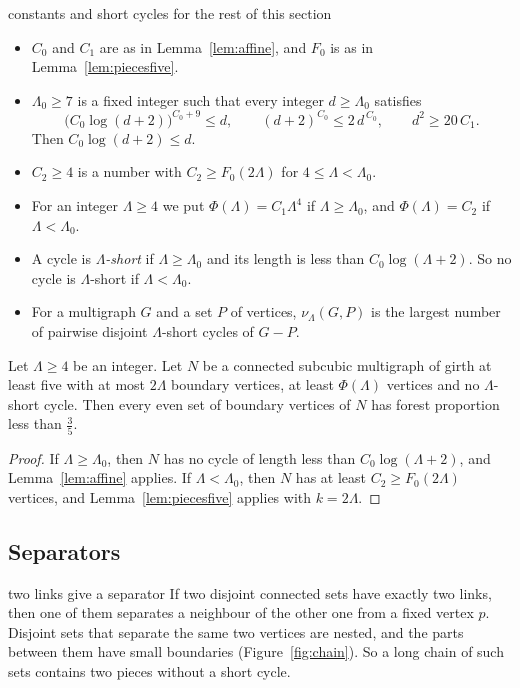 \begin{notation}{constants and short cycles for the rest of this section}
\begin{itemize}[leftmargin=1.2em]
\item $C_0$ and $C_1$ are as in Lemma~\ref{lem:affine}, and $F_0$ is as in
Lemma~\ref{lem:piecesfive}.
\item $\Lambda_0\ge7$ is a fixed integer such that every integer $d\ge\Lambda_0$ satisfies
\[
  \bigl(C_0\log(d+2)\bigr)^{C_0+9}\le d,\qquad (d+2)^{C_0}\le2\,d^{\,C_0},\qquad d^{2}\ge20\,C_1 .
\]
Then $C_0\log(d+2)\le d$.
\item $C_2\ge4$ is a number with $C_2\ge F_0(2\Lambda)$ for $4\le\Lambda<\Lambda_0$.
\item For an integer $\Lambda\ge4$ we put $\Phi(\Lambda)=C_1\Lambda^{4}$ if
$\Lambda\ge\Lambda_0$, and $\Phi(\Lambda)=C_2$ if $\Lambda<\Lambda_0$.
\item A cycle is \emph{$\Lambda$-short} if $\Lambda\ge\Lambda_0$ and its length is less than
$C_0\log(\Lambda+2)$. So no cycle is $\Lambda$-short if $\Lambda<\Lambda_0$.
\item For a multigraph $G$ and a set $P$ of vertices, $\nu_\Lambda(G,P)$ is the largest number
of pairwise disjoint $\Lambda$-short cycles of $G-P$.
\end{itemize}
\end{notation}

\begin{corollary}[Pieces]\label{cor:pieces}
Let $\Lambda\ge4$ be an integer. Let $N$ be a connected subcubic multigraph of girth at least
five with at most $2\Lambda$ boundary vertices, at least $\Phi(\Lambda)$ vertices and no
$\Lambda$-short cycle. Then every even set of boundary vertices of $N$ has forest proportion
less than $\frac35$.
\end{corollary}

\begin{proof}
If $\Lambda\ge\Lambda_0$, then $N$ has no cycle of length less than $C_0\log(\Lambda+2)$, and
Lemma~\ref{lem:affine} applies. If $\Lambda<\Lambda_0$, then $N$ has at least
$C_2\ge F_0(2\Lambda)$ vertices, and Lemma~\ref{lem:piecesfive} applies with $k=2\Lambda$.
\end{proof}

\subsection{Separators}\label{sec:separators}

\begin{idea}{two links give a separator}
If two disjoint connected sets have exactly two links, then one of them separates a neighbour of
the other one from a fixed vertex $p$. Disjoint sets that separate the same two vertices are
nested, and the parts between them have small boundaries (Figure~\ref{fig:chain}). So a long
chain of such sets contains two pieces without a short cycle.
\end{idea}

